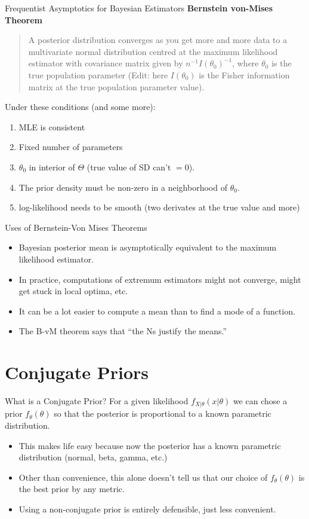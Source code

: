 \documentclass[aspectratio=169]{beamer}
\begin{document}
\begin{frame}{Frequentist Asymptotics for Bayesian Estimators}
\textbf{Bernstein von-Mises Theorem}
\begin{quote}
A posterior distribution converges as you get more and more data to a multivariate normal distribution centred at the maximum likelihood estimator with covariance matrix given by $n^{-1} I(\theta_0)^{-1}$, where $\theta_0$ is the true population parameter (Edit: here $I(\theta_0)$ is the Fisher information matrix at the true population parameter value).
\end{quote}
Under these conditions (and some more):
\begin{enumerate}
\item MLE is consistent
\item Fixed number of parameters
\item $\theta_0$ in interior of $\Theta$ (true value of SD can't $=0$).
\item The prior density must be non-zero in a neighborhood of $\theta_0$.
\item  log-likelihood needs to be smooth (two derivates at the true value and more)
\end{enumerate}
\end{frame}
\begin{frame}{Uses of Bernstein-Von Mises Theorems}
\begin{itemize}
\item Bayesian posterior mean is asymptotically
equivalent to the maximum likelihood estimator.
\item In practice, computations of extremum estimators might not converge,
might get stuck in local optima, etc.
\item It can be a lot easier to compute a mean than to find a mode of a
function.
\item The B-vM theorem says that ``the Ns justify the means.''
\end{itemize}
\end{frame}


\section{Conjugate Priors}
\begin{frame}{What is a Conjugate Prior?}
For a given \alert{likelihood} $f_{X|\theta}(x| \theta)$ we can chose a \alert{prior} $f_{\theta}(\theta)$ so that the \alert{posterior} is proportional to a known parametric distribution.
\begin{itemize}
\item This makes life easy because now the posterior has a known parametric distribution (normal, beta, gamma, etc.)
\item Other than convenience, this alone doesn't tell us that our choice of $f_{\theta}(\theta)$ is the \alert{best} prior by any metric.
\item Using a non-conjugate prior is entirely defensible, just less convenient.
\end{itemize}
\end{frame}
\end{document}
